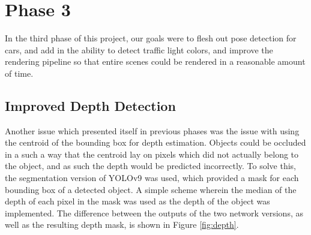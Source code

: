 \section{Phase 3}
In the third phase of this project, our goals were to flesh out pose detection for cars, and add in the ability to detect traffic light colors, and improve the rendering pipeline so that entire scenes could be rendered in a reasonable amount of time.

\subsection{Improved Depth Detection}
Another issue which presented itself in previous phases was the issue with using the centroid of the bounding box for depth estimation. Objects could be occluded in a such a way that the centroid lay on pixels which did not actually belong to the object, and as such the depth would be predicted incorrectly. To solve this, the segmentation version of YOLOv9 was used, which provided a mask for each bounding box of a detected object. A simple scheme wherein the median of the depth of each pixel in the mask was used as the depth of the object was implemented. The difference between the outputs of the two network versions, as well as the resulting depth mask, is shown in Figure \ref{fig:depth}.

